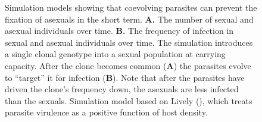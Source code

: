 \documentclass[
  letterpaper,
]{book}
\begin{document}
\begin{figure}


\caption[Simulation models showing that coevolving parasites can prevent
the fixation of asexuals in the short term]{\label{fig-2-3}Simulation
models showing that coevolving parasites can prevent the fixation of
asexuals in the short term. \textbf{A.} The number of sexual and asexual
individuals over time. \textbf{B.} The frequency of infection in sexual
and asexual individuals over time. The simulation introduces a single
clonal genotype into a sexual population at carrying capacity. After the
clone becomes common (\textbf{A}) the parasites evolve to ``target'' it
for infection (\textbf{B}). Note that after the parasites have driven
the clone's frequency down, the asexuals are less infected than the
sexuals. Simulation model based on Lively
(), which treats parasite virulence as a
positive function of host density.}

\end{figure}%
\end{document}
